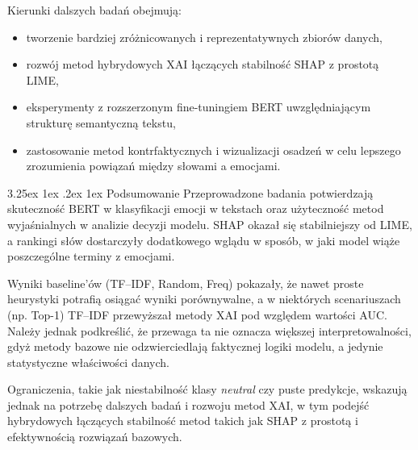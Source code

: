 \documentclass[wmii, inf, mgr]{uwmthesis}
\makeatletter
\renewcommand\paragraph{\@startsection{paragraph}{4}{\z@}%
  {3.25ex \@plus1ex \@minus.2ex}%
  {1ex}%
  {\normalfont\normalsize\bfseries}}
\makeatother
\begin{document}
Kierunki dalszych badań obejmują:
\begin{itemize}
	\item tworzenie bardziej zróżnicowanych i reprezentatywnych zbiorów danych,
	\item rozwój metod hybrydowych XAI łączących stabilność SHAP z prostotą LIME,
	\item eksperymenty z rozszerzonym fine-tuningiem BERT uwzględniającym strukturę semantyczną tekstu,
	\item zastosowanie metod kontrfaktycznych i wizualizacji osadzeń w celu lepszego zrozumienia powiązań między słowami a emocjami.
\end{itemize}

\paragraph{Podsumowanie}
Przeprowadzone badania potwierdzają skuteczność BERT w klasyfikacji emocji w tekstach oraz użyteczność metod wyjaśnialnych w analizie decyzji modelu. SHAP okazał się stabilniejszy od LIME, a rankingi słów dostarczyły dodatkowego wglądu w sposób, w jaki model wiąże poszczególne terminy z emocjami. 

Wyniki baseline’ów (TF--IDF, Random, Freq) pokazały, że nawet proste heurystyki potrafią osiągać wyniki porównywalne, a w niektórych scenariuszach (np. Top-1) TF--IDF przewyższał metody XAI pod względem wartości AUC. Należy jednak podkreślić, że przewaga ta nie oznacza większej interpretowalności, gdyż metody bazowe nie odzwierciedlają faktycznej logiki modelu, a jedynie statystyczne właściwości danych. 

Ograniczenia, takie jak niestabilność klasy \textit{neutral} czy puste predykcje, wskazują jednak na potrzebę dalszych badań i rozwoju metod XAI, w tym podejść hybrydowych łączących stabilność metod takich jak SHAP z prostotą i efektywnością rozwiązań bazowych.




\pagebreak
{}
\listoffigures

\newpage
{}
\listoftables


\printbibliography
\end{document}
